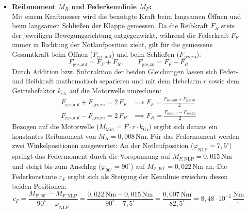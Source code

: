 \documentclass[a4paper,10pt,department=FakEI]{OTHRartcl}
\begin{document}
\begin{itemize}
    \item \textbf{Reibmoment $M_R$ und Federkennlinie $M_F$:}\\
    Mit einem Kraftmesser wird die benötigte Kraft beim langsamen Öffnen und beim langsamen Schließen der Klappe gemessen. Da die Reibkraft $F_R$ stets der jeweiligen Bewegungsrichtung entgegenwirkt, während die Federkraft $F_F$ immer in Richtung der Notlaufposition zieht, gilt für die gemessene Gesamtkraft beim Öffnen ($F_{\text{ges,auf}}$) und beim Schließen ($F_{\text{ges,zu}}$):
    \begin{equation}
        F_{\text{ges,auf}} = F_F + F_R, \qquad F_{\text{ges,zu}} = F_F - F_R
    \end{equation}
    Durch Addition bzw. Subtraktion der beiden Gleichungen lassen sich Feder- und Reibkraft mathematisch separieren und mit dem Hebelarm $r$ sowie dem Getriebefaktor $k_{\text{Gr}}$ auf die Motorwelle umrechnen:
    \begin{align}
        F_{\text{ges,auf}} + F_{\text{ges,zu}} = 2\,F_F &\implies F_F = \frac{F_{\text{ges,auf}} + F_{\text{ges,zu}}}{2} \\
        F_{\text{ges,auf}} - F_{\text{ges,zu}} = 2\,F_R &\implies F_R = \frac{F_{\text{ges,auf}} - F_{\text{ges,zu}}}{2}
    \end{align}
    Bezogen auf die Motorwelle ($M_{\text{Mot}} = F \cdot r \cdot k_{\text{Gr}}$) ergibt sich daraus ein konstantes Reibmoment von $M_R = 0{,}008\,\text{Nm}$. Für das Federmoment werden zwei Winkelpositionen ausgewertet: An der Notlaufposition ($\varphi_{\text{NLP}} = 7{,}5^\circ$) springt das Federmoment durch die Vorspannung auf $M_{F,\text{NLP}} = 0{,}015\,\text{Nm}$ und steigt bis zum Anschlag ($\varphi_{90^\circ} = 90^\circ$) auf $M_{F,90^\circ} = 0{,}022\,\text{Nm}$ an. Die Federkonstante $c_F$ ergibt sich als Steigung der Kennlinie zwischen diesen beiden Positionen:
    \begin{equation}
        c_F = \frac{M_{F,90^\circ} - M_{F,\text{NLP}}}{90^\circ - \varphi_{\text{NLP}}} = \frac{0{,}022\,\text{Nm} - 0{,}015\,\text{Nm}}{90^\circ - 7{,}5^\circ} = \frac{0{,}007\,\text{Nm}}{82{,}5^\circ} = 8{,}48 \cdot 10^{-5}\,\frac{\text{Nm}}{^\circ}
    \end{equation}


\end{itemize}
\end{document}
